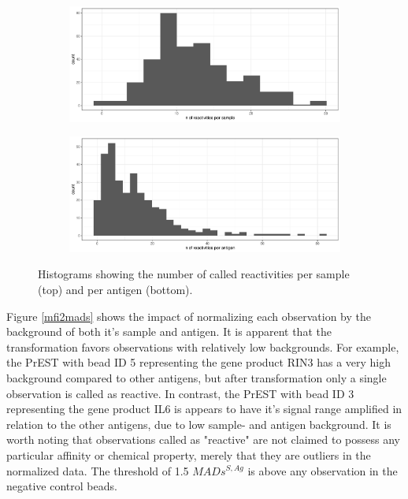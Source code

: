 \documentclass{article}
\begin{document}
\begin{figure}[H]
	\centering
	\begin{subfigure}[H]{0.8\linewidth}
		\includegraphics[width=\linewidth]{figures/reactive_per_sample.pdf}
	\end{subfigure}
	\begin{subfigure}[H]{0.8\linewidth}
		\includegraphics[width=\linewidth]{figures/reactive_per_ag.pdf}
	\end{subfigure}
	\caption{Histograms showing the number of called reactivities per sample (top) and per antigen (bottom).}
	\label{reactive_hist}
\end{figure}

Figure \ref{mfi2mads} shows the impact of normalizing each observation by the background of both it's sample and antigen. It is apparent that the transformation favors observations with relatively low backgrounds. For example, the PrEST with bead ID 5 representing the gene product RIN3 has a very high background compared to other antigens, but after transformation only a single observation is called as reactive. In contrast, the PrEST with bead ID 3 representing the gene product IL6 is appears to have it's signal range amplified in relation to the other antigens, due to low sample- and antigen background. It is worth noting that observations called as "reactive" are not claimed to possess any particular affinity or chemical property, merely that they are outliers in the normalized data. The threshold of 1.5 $MADs^{S,Ag}$ is above any observation in the negative control beads.
\end{document}
